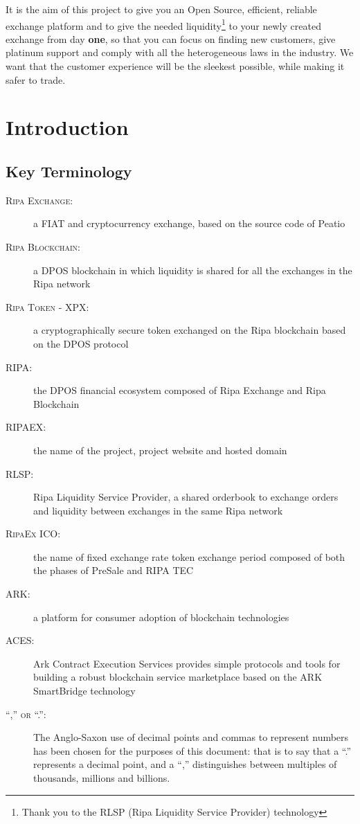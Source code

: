 \documentclass[11pt,fleqn,oneside]{book} %
\begin{document}
It is the aim of this project to give you an Open Source, efficient, reliable exchange platform and to give the needed liquidity\footnote{Thank you to the RLSP (Ripa Liquidity Service Provider) technology} 
to your newly created exchange from day \textbf{one}, so that you can focus on finding new customers, give platinum support and comply with all 
the heterogeneous laws in the industry. We want that the customer experience will be the sleekest possible, while making it safer to 
trade.
\usechapterimagetrue




\chapter{Introduction}

\section{Key Terminology}
	\begin{description}
		\item[\textsc{Ripa Exchange:}] a FIAT and cryptocurrency exchange, based on the source code of Peatio
		\item[\textsc{Ripa Blockchain:}] a DPOS blockchain in which liquidity is shared for all the exchanges in the Ripa network
		\item[\textsc{Ripa Token - XPX:}] a cryptographically secure token exchanged on the Ripa blockchain based on the DPOS protocol
		\item[\textsc{RIPA:}] the DPOS financial ecosystem composed of Ripa Exchange and Ripa Blockchain
		\item[\textsc{RIPAEX:}] the name of the project, project website and hosted domain
		\item[\textsc{RLSP:}] Ripa Liquidity Service Provider, a shared orderbook to exchange orders and liquidity between exchanges in the same Ripa network
		\item[\textsc{RipaEx ICO:}] the name of fixed exchange rate token exchange period composed of both the phases of PreSale and RIPA TEC
		\item[\textsc{ARK:}] a platform for consumer adoption of blockchain technologies
		\item[\textsc{ACES:}] Ark Contract Execution Services provides simple protocols and tools for building a robust 
		blockchain service marketplace based on the ARK SmartBridge technology
		\item[\textsc{``,'' or ``.'':}] The Anglo-Saxon use of decimal points and commas to represent numbers has
		been chosen for the purposes of this document: that is to say that a “.” represents a decimal point, and a “,”
		distinguishes between multiples of thousands, millions and billions.
    \end{description}
\end{document}
